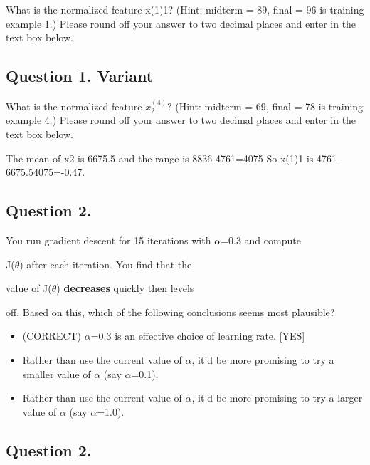 \documentclass[11pt]{article} %
\begin{document}
	What is the normalized feature x(1)1? (Hint: midterm = 89, final = 96 is training example 1.) Please round off your answer to two decimal places and enter in the text box below.

	\subsection{Question 1. Variant} 	
	What is the normalized feature $x^{(4)}_2$? (Hint: midterm = 69, final = 78 is training example 4.) Please round off your answer to two decimal places and enter in the text box below.
	
	
The mean of x2 is 6675.5 and the range is 8836-4761=4075 So x(1)1 is 4761-6675.54075=-0.47.
	
	\subsection{Question 2.} 
	You run gradient descent for 15 iterations 	with $\alpha$=0.3 and compute
	
	J($\theta$) after each iteration. You find that the
	
	value of J($\theta$) \textbf{decreases} quickly then levels
	
	off. Based on this, which of the following conclusions seems most plausible?
	
	
\begin{itemize}
	\item (CORRECT)	$\alpha$=0.3 is an effective choice of learning rate.  [YES]
	
	\item Rather than use the current value of $\alpha$, it'd be more promising to try a smaller value of $\alpha$ (say $\alpha$=0.1).
	
	\item Rather than use the current value of $\alpha$, it'd be more promising to try a larger value of $\alpha$ (say $\alpha$=1.0).
\end{itemize}	

	
	
	\subsection{Question 2.} 
		
\end{document}
